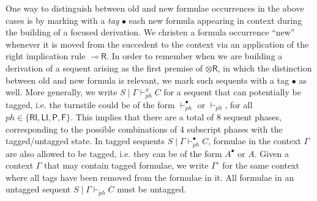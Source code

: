 \documentclass[copyright,creativecommons]{eptcs}
\theoremstyle{definition}
\newcommand{\tr}{\otimes \mathsf{R}}
\newcommand{\lright}{{\multimap}\mathsf{R}}
\newcommand{\RI}{\mathsf{RI}}
\newcommand{\LI}{\mathsf{LI}}
\newcommand{\Pass}{\mathsf{P}}
\newcommand{\F}{\mathsf{F}}
\newcommand{\xvdash}{\vdash^{x}}
\begin{document}
One way to distinguish between old and new formulae occurrences in the above cases is by marking with a \emph{tag} $\bullet$ each new formula appearing in context during the building of a focused derivation. We christen a formula occurrence ``new'' whenever it is moved from the succedent to the context via an application of the right implication rule $\lright$. In order to remember when we are building a derivation of a sequent arising as the first premise of $\tr$, in which the distinction between old and new formula is relevant, we mark such sequents with a tag $\bullet$ as well.
More generally, we write $S \mid \Gamma \xvdash_{ph} C$ for a sequent that can potentially be tagged, i.e. the turnstile could be of the form $\vdash_{ph}^{\bullet}$ or $\vdash_{ph}$, for all $ph \in \{ \RI,\LI,\Pass,\F\}$. This implies that there are a total of 8 sequent phases, corresponding to the possible combinations of 4 subscript phases with the tagged/untagged state.
In tagged sequents  $S \mid \Gamma \vdash_{ph}^{\bullet} C$, formulae in the context $\Gamma$ are also allowed to be tagged, i.e. they can be of the form $A^\bullet$ or $A$. Given a context $\Gamma$ that may contain tagged formulae, we write $\Gamma^{\circ}$ for the same context where all tags have been removed from the formulae in it. All formulae in an untagged sequent $S \mid \Gamma \vdash_{ph} C$ must be untagged.
\end{document}
